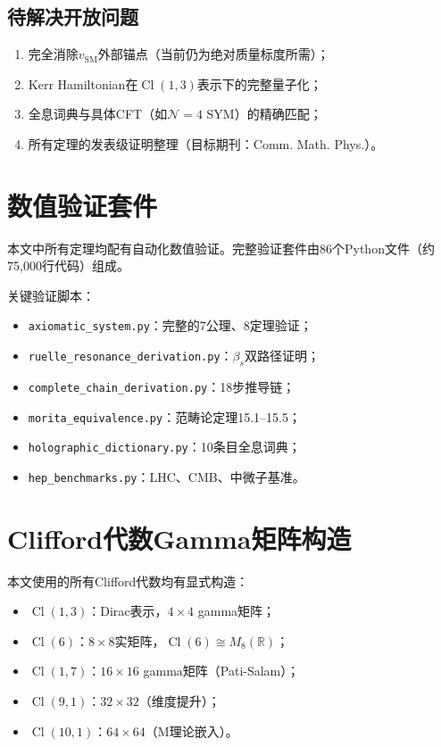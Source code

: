 \documentclass[12pt,a4paper]{ctexart}
\newcommand{\R}{\mathbb{R}}
\newcommand{\Cl}{\operatorname{Cl}}
\begin{document}
\subsection*{待解决开放问题}

\begin{enumerate}
  \item 完全消除$v_{\text{SM}}$外部锚点（当前仍为绝对质量标度所需）；
  \item Kerr Hamiltonian在$\Cl(1,3)$表示下的完整量子化；
  \item 全息词典与具体CFT（如$\mathcal{N}=4$ SYM）的精确匹配；
  \item 所有定理的发表级证明整理（目标期刊：Comm. Math. Phys.）。
\end{enumerate}

\appendix
\section{数值验证套件}

本文中所有定理均配有自动化数值验证。完整验证套件由86个Python文件（约75,000行代码）组成。

关键验证脚本：
\begin{itemize}
  \item \texttt{axiomatic\_system.py}：完整的7公理、8定理验证；
  \item \texttt{ruelle\_resonance\_derivation.py}：$\beta_s$双路径证明；
  \item \texttt{complete\_chain\_derivation.py}：18步推导链；
  \item \texttt{morita\_equivalence.py}：范畴论定理15.1--15.5；
  \item \texttt{holographic\_dictionary.py}：10条目全息词典；
  \item \texttt{hep\_benchmarks.py}：LHC、CMB、中微子基准。
\end{itemize}

\section{Clifford代数Gamma矩阵构造}

本文使用的所有Clifford代数均有显式构造：
\begin{itemize}
  \item $\Cl(1,3)$：Dirac表示，$4\times4$ gamma矩阵；
  \item $\Cl(6)$：$8\times8$实矩阵，$\Cl(6) \cong M_8(\R)$；
  \item $\Cl(1,7)$：$16\times16$ gamma矩阵（Pati-Salam）；
  \item $\Cl(9,1)$：$32\times32$（维度提升）；
  \item $\Cl(10,1)$：$64\times64$（M理论嵌入）。
\end{itemize}
\end{document}
